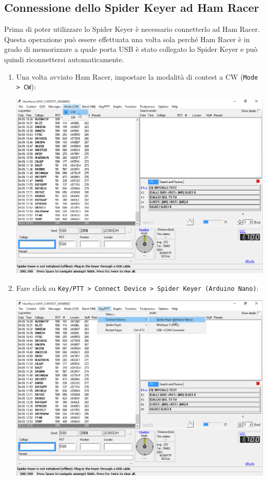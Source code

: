 \subsection{Connessione dello Spider Keyer ad Ham Racer}
Prima di poter utilizzare lo Spider Keyer \`e necessario connetterlo ad Ham Racer.
Questa operazione pu\`o essere effettuata una volta sola perch\'e Ham Racer \`e in grado di memorizzare a quale porta USB \`e stato collegato lo Spider Keyer e pu\`o quindi riconnettersi automaticamente.
\pagebreak
\begin{enumerate}
	\item Una volta avviato Ham Racer, impostare la modalit\`a di contest a CW (\texttt{Mode > CW}):
	\begin{center}
		\includegraphics[width=\linewidth]{./hamracer01.png}
	\end{center}
	\item Fare click su \texttt{Key/PTT > Connect Device > Spider Keyer (Arduino Nano)}:
	\begin{center}
		\includegraphics[width=\linewidth]{./hamracer02.png}
	\end{center}
\end{enumerate}
